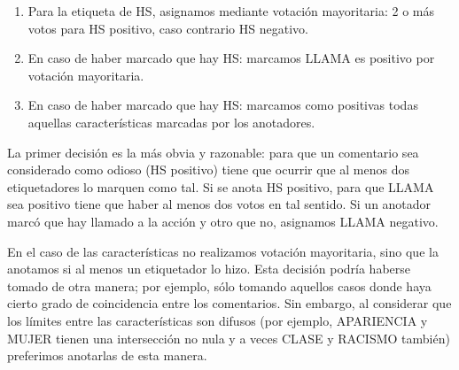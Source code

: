 \begin{enumerate}
    \item Para la etiqueta de HS, asignamos mediante votación mayoritaria: 2 o más votos para HS positivo, caso contrario HS negativo.
    \item En caso de haber marcado que hay HS: marcamos LLAMA es positivo por votación mayoritaria.
    \item En caso de haber marcado que hay HS: marcamos como positivas todas aquellas características marcadas por los anotadores.
\end{enumerate}

La primer decisión es la más obvia y razonable: para que un comentario sea considerado como odioso (HS positivo) tiene que ocurrir que al menos dos etiquetadores lo marquen como tal. Si se anota HS positivo, para que LLAMA sea positivo tiene que haber al menos dos votos en tal sentido. Si un anotador marcó que hay llamado a la acción y otro que no, asignamos LLAMA negativo. 

En el caso de las características no realizamos votación mayoritaria, sino que la anotamos si al menos un etiquetador lo hizo. Esta decisión podría haberse tomado de otra manera; por ejemplo, sólo tomando aquellos casos donde haya cierto grado de coincidencia entre los comentarios. Sin embargo, al considerar que los límites entre las características son difusos (por ejemplo, APARIENCIA y MUJER tienen una intersección no nula y a veces CLASE y RACISMO también) preferimos anotarlas de esta manera.
